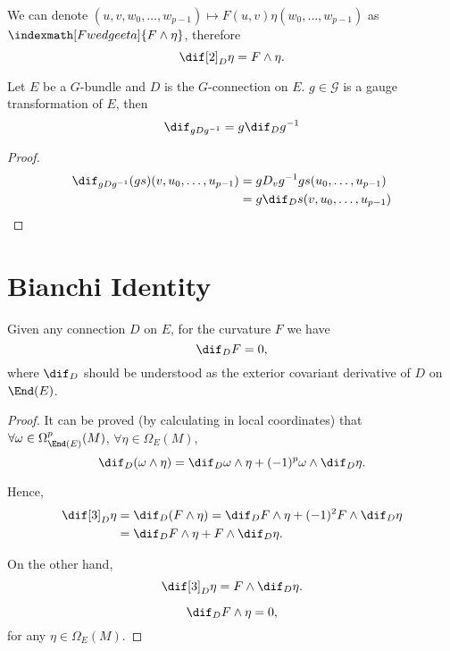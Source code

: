 \documentclass[openany, oneside, a5paper]{book}
\begin{document}
We can denote $(u, v, w_0, \ldots, w_{p-1}) \mapsto F(u, v) \eta(w_0, \ldots, w_{p-1})$ as $\indexmath[F wedge eta]{F \wedge \eta}$, therefore
\begin{equation}
    \dif[2]_D \eta = F \wedge \eta.
\end{equation}

\begin{theorem}
    Let $E$ be a $G$-bundle and $D$ is the $G$-connection on $E$.
    $g \in \mathcal G$ is a gauge transformation of $E$, then
    \begin{equation}
        \dif_{gDg^{-1}} = g \dif_D g^{-1}
    \end{equation}
\end{theorem}
\begin{proof}
    \begin{align}
        \dif_{gDg^{-1}} (gs) (v, u_0, \ldots, u_{p-1}) 
            &= g D_v g^{-1} gs (u_0, \ldots, u_{p-1})
            \\
            &= g \dif_D s (v, u_0, \ldots, u_{p-1})
    \end{align}
\end{proof}

\section{Bianchi Identity}

\begin{theorem}
    Given any connection $D$ on $E$, for the curvature $F$ we have
    \begin{equation}
        \dif_D F = 0,
    \end{equation}
    where $\dif_D$ should be understood as the exterior covariant derivative of $D$ on $\End(E)$.
\end{theorem}
\begin{proof}
    It can be proved (by calculating in local coordinates) that $\forall \omega \in \Omega^p_{\End(E)}(M)$, $\forall \eta \in \Omega_E(M)$,
    \begin{equation}
        \dif_D (\omega \wedge \eta) = \dif_D \omega \wedge \eta + (-1)^p \omega \wedge \dif_D \eta.
    \end{equation}

    Hence, 
    \begin{align}
        \dif[3]_D \eta &= \dif_D (F \wedge \eta)
        = \dif_D F \wedge \eta + (-1)^2 F \wedge \dif_D \eta
        \\
        &= \dif_D F \wedge \eta + F \wedge \dif_D \eta.
    \end{align}
    
    On the other hand,
    \begin{equation}
        \dif[3]_D \eta = F \wedge \dif_D \eta.
    \end{equation}

    \hence
    \begin{equation}
        \dif_D F \wedge \eta = 0,
    \end{equation}
    for any $\eta \in \Omega_E(M)$.
\end{proof}
\end{document}
